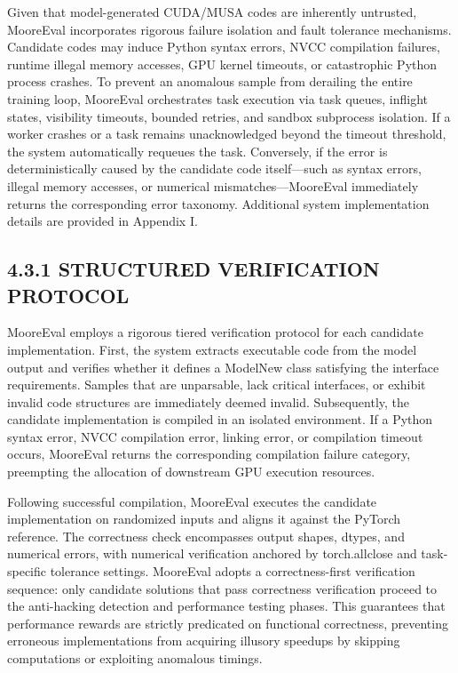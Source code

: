 \documentclass[
  10
]{article}
\begin{document}
Given that model-generated CUDA/MUSA codes are inherently untrusted,
MooreEval incorporates rigorous failure isolation and fault tolerance
mechanisms. Candidate codes may induce Python syntax errors, NVCC
compilation failures, runtime illegal memory accesses, GPU kernel
timeouts, or catastrophic Python process crashes. To prevent an
anomalous sample from derailing the entire training loop, MooreEval
orchestrates task execution via task queues, inflight states, visibility
timeouts, bounded retries, and sandbox subprocess isolation. If a worker
crashes or a task remains unacknowledged beyond the timeout threshold,
the system automatically requeues the task. Conversely, if the error is
deterministically caused by the candidate code itself---such as syntax
errors, illegal memory accesses, or numerical mismatches---MooreEval
immediately returns the corresponding error taxonomy. Additional system
implementation details are provided in Appendix I.

\subsection{4.3.1 STRUCTURED VERIFICATION
PROTOCOL}\label{structured-verification-protocol}

MooreEval employs a rigorous tiered verification protocol for each
candidate implementation. First, the system extracts executable code
from the model output and verifies whether it defines a ModelNew class
satisfying the interface requirements. Samples that are unparsable, lack
critical interfaces, or exhibit invalid code structures are immediately
deemed invalid. Subsequently, the candidate implementation is compiled
in an isolated environment. If a Python syntax error, NVCC compilation
error, linking error, or compilation timeout occurs, MooreEval returns
the corresponding compilation failure category, preempting the
allocation of downstream GPU execution resources.

Following successful compilation, MooreEval executes the candidate
implementation on randomized inputs and aligns it against the PyTorch
reference. The correctness check encompasses output shapes, dtypes, and
numerical errors, with numerical verification anchored by torch.allclose
and task-specific tolerance settings. MooreEval adopts a
correctness-first verification sequence: only candidate solutions that
pass correctness verification proceed to the anti-hacking detection and
performance testing phases. This guarantees that performance rewards are
strictly predicated on functional correctness, preventing erroneous
implementations from acquiring illusory speedups by skipping
computations or exploiting anomalous timings.
\end{document}
